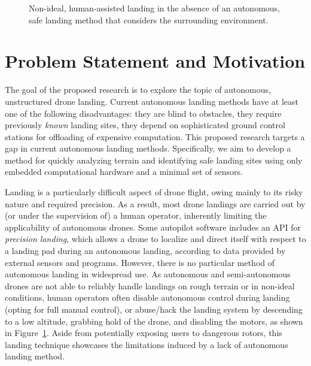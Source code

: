 \begin{figure}[ht]
    \centering
    \begin{minipage}{\wd0}
      \caption{Non-ideal, human-assisted landing in the absence of an autonomous, safe landing method that considers the surrounding environment.}
      \label{figure:hand_landing}
    \end{minipage}
\end{figure}

\section{Problem Statement and Motivation}

The goal of the proposed research is to explore the topic of
autonomous, unstructured drone landing.
Current autonomous landing methods have at least one of the following disadvantages:
they are blind to obstacles,
they require previously \textit{known} landing sites,
they depend on sophisticated ground control stations for offloading of expensive computation.
This proposed research targets a gap in current autonomous landing methods.
Specifically, we aim to develop a method for quickly analyzing terrain
and identifying safe landing sites using only embedded computational hardware
and a minimal set of sensors.

Landing is a particularly difficult aspect of drone flight,
owing mainly to its risky nature and required precision.
As a result, most drone landings are carried out by
(or under the supervision of)
a human operator,
inherently limiting the applicability of autonomous drones.
Some autopilot software includes an \gls{API} for \textit{precision landing},
which allows a drone to localize and direct itself with respect to a landing pad during an autonomous landing,
according to data provided by external sensors and programs.
However, there is no particular method of autonomous landing in widespread use.
As autonomous and semi-autonomous drones are not able to reliably handle landings
on rough terrain or in non-ideal conditions, human operators often disable
autonomous control during landing (opting for full manual control),
or abuse/hack the landing system by descending to a low altitude,
grabbing hold of the drone,
and disabling the motors,
as shown in Figure~\ref{figure:hand_landing}.
Aside from potentially exposing users to dangerous rotors,
this landing technique showcases the limitations induced by a lack of
autonomous landing method.

